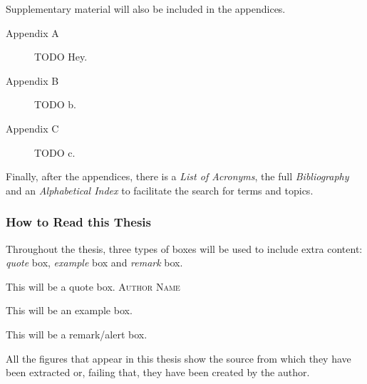 Supplementary material will also be included in the appendices.

\begin{description}
  \item [Appendix A] TODO Hey. 
  \item [Appendix B] TODO b. 
  \item [Appendix C] TODO c. 
\end{description}

Finally, after the appendices, there is a \textsl{List of Acronyms}, the full
\textsl{Bibliography} and an \textsl{Alphabetical Index} to facilitate the
search for terms and topics.

\subsubsection{How to Read this Thesis}

Throughout the thesis, three types of boxes will be used to include extra
content: \emph{quote} box, \emph{example} box and \emph{remark} box.

\begin{quoteBox}
  This will be a quote box.
  \tcblower\textsc{Author Name}
\end{quoteBox}

\begin{exampleBox}
  This will be an example box.
\end{exampleBox}

\begin{remarkBox}
  This will be a remark/alert box.
\end{remarkBox}

All the figures that appear in this thesis show the source from which they have
been extracted or, failing that, they have been created by the author.
